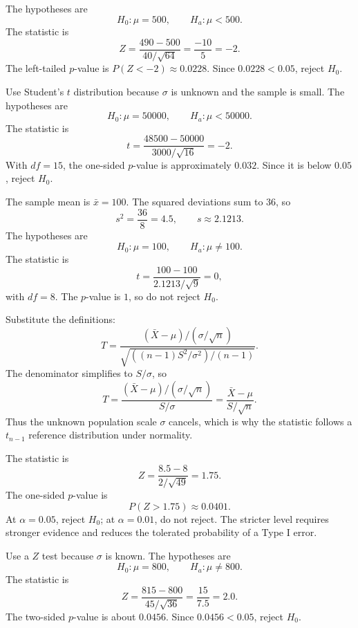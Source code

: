 \begin{solproblema}[prob:c7ea911]
The hypotheses are
\[
	H_0:\mu=500,\qquad H_a:\mu<500.
\]
The statistic is
\[
	Z=\frac{490-500}{40/\sqrt{64}}=\frac{-10}{5}=-2.
\]
The left-tailed $p$-value is $P(Z<-2)\approx 0.0228$. Since $0.0228<0.05$, reject $H_0$.
\end{solproblema}

\begin{solproblema}[prob:f6ad523]
Use Student's $t$ distribution because $\sigma$ is unknown and the sample is small. The hypotheses are
\[
	H_0:\mu=50000,\qquad H_a:\mu<50000.
\]
The statistic is
\[
	t=\frac{48500-50000}{3000/\sqrt{16}}=-2.
\]
With $df=15$, the one-sided $p$-value is approximately $0.032$. Since it is below $0.05$, reject $H_0$.
\end{solproblema}

\begin{solproblema}
The sample mean is $\bar x=100$. The squared deviations sum to $36$, so
\[
	s^2=\frac{36}{8}=4.5,\qquad s\approx 2.1213.
\]
The hypotheses are
\[
	H_0:\mu=100,\qquad H_a:\mu\ne 100.
\]
The statistic is
\[
	t=\frac{100-100}{2.1213/\sqrt9}=0,
\]
with $df=8$. The $p$-value is $1$, so do not reject $H_0$.
\end{solproblema}

\begin{solproblema}[prob:6c535e4]
Substitute the definitions:
\[
	T=\frac{(\bar X-\mu)/(\sigma/\sqrt n)}
	{\sqrt{\left((n-1)S^2/\sigma^2\right)/(n-1)}}.
\]
The denominator simplifies to $S/\sigma$, so
\[
	T=\frac{(\bar X-\mu)/(\sigma/\sqrt n)}{S/\sigma}
	=\frac{\bar X-\mu}{S/\sqrt n}.
\]
Thus the unknown population scale $\sigma$ cancels, which is why the statistic follows a $t_{n-1}$ reference distribution under normality.
\end{solproblema}

\begin{solproblema}[prob:a9a27c5]
The statistic is
\[
	Z=\frac{8.5-8}{2/\sqrt{49}}=1.75.
\]
The one-sided $p$-value is
\[
	P(Z>1.75)\approx 0.0401.
\]
At $\alpha=0.05$, reject $H_0$; at $\alpha=0.01$, do not reject. The stricter level requires stronger evidence and reduces the tolerated probability of a Type I error.
\end{solproblema}

\begin{solproblema}
Use a $Z$ test because $\sigma$ is known. The hypotheses are
\[
	H_0:\mu=800,\qquad H_a:\mu\ne 800.
\]
The statistic is
\[
	Z=\frac{815-800}{45/\sqrt{36}}=\frac{15}{7.5}=2.0.
\]
The two-sided $p$-value is about $0.0456$. Since $0.0456<0.05$, reject $H_0$.
\end{solproblema}
